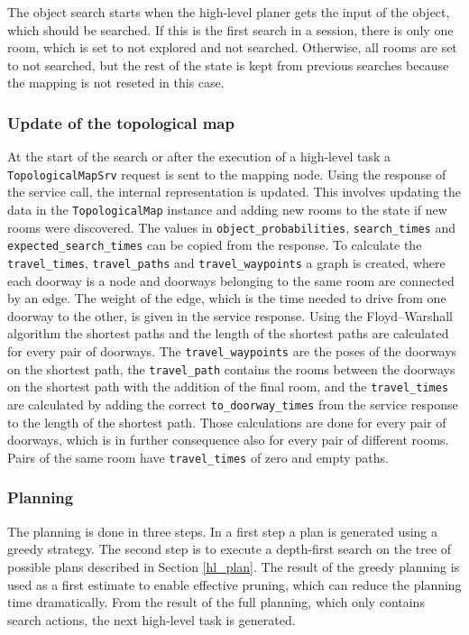 The object search starts when the high-level planer gets the input of the object, which should be searched. If this is the first search in a session, there is only one room, which is set to not explored and not searched. Otherwise, all rooms are set to not searched, but the rest of the state is kept from previous searches because the mapping is not reseted in this case.

\subsubsection{Update of the topological map}

At the start of the search or after the execution of a high-level task a \texttt{TopologicalMapSrv} request is sent to the mapping node. Using the response of the service call, the internal representation is updated. This involves updating the data in the \texttt{TopologicalMap} instance and adding new rooms to the state if new rooms were discovered. The values in \texttt{object{\_}probabilities}, \texttt{search{\_}times} and \texttt{expected{\_}search{\_}times} can be copied from the response. To calculate the \texttt{travel{\_}times}, \texttt{travel{\_}paths} and \texttt{travel{\_}waypoints} a graph is created, where each doorway is a node and doorways belonging to the same room are connected by an edge. The weight of the edge, which is the time needed to drive from one doorway to the other, is given in the service response. Using the Floyd–Warshall algorithm the shortest paths and the length of the shortest paths are calculated for every pair of doorways. The \texttt{travel{\_}waypoints} are the poses of the doorways on the shortest path, the \texttt{travel{\_}path} contains the rooms between the doorways on the shortest path with the addition of the final room, and the \texttt{travel{\_}times} are calculated by adding the correct \texttt{to{\_}doorway{\_}times} from the service response to the length of the shortest path. Those calculations are done for every pair of doorways, which is in further consequence also for every pair of different rooms. Pairs of the same room have \texttt{travel{\_}times} of zero and empty paths. 

\subsubsection{Planning}

The planning is done in three steps. In a first step a plan is generated using a greedy strategy. The second step is to execute a depth-first search on the tree of possible plans described in Section \ref{hl_plan}. The result of the greedy planning is used as a first estimate to enable effective pruning, which can reduce the planning time dramatically. From the result of the full planning, which only contains search actions, the next high-level task is generated.

